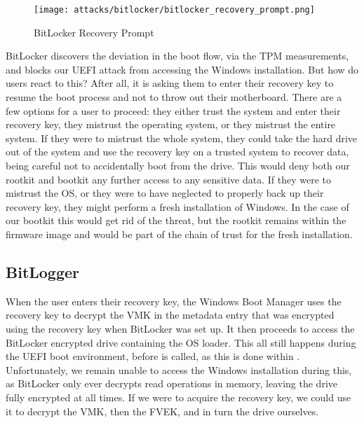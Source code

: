 \begin{figure}[htb]
    \centering
    \texttt{[image: attacks/bitlocker/bitlocker\_recovery\_prompt.png]}
    \caption{BitLocker Recovery Prompt}
    \label{fig:bitlocker-recovery-prompt}
\end{figure}

BitLocker discovers the deviation in the boot flow, via the \ac{TPM} measurements, and blocks our \ac{UEFI} attack from accessing the Windows installation.
But how do users react to this?
After all, it is asking them to enter their recovery key to resume the boot process and not to throw out their motherboard.
There are a few options for a user to proceed: they either trust the system and enter their recovery key, they mistrust the operating system, or they mistrust the entire system.
If they were to mistrust the whole system, they could take the hard drive out of the system and use the recovery key on a trusted system to recover data, being careful not to accidentally boot from the drive.
This would deny both our rootkit and bootkit any further access to any sensitive data.
If they were to mistrust the \ac{OS}, or they were to have neglected to properly back up their recovery key, they might perform a fresh installation of Windows.
In the case of our bootkit this would get rid of the threat, but the rootkit remains within the firmware image and would be part of the chain of trust for the fresh installation.

\vspace{-0.5em}
\subsection{BitLogger}
\vspace{-0.5em}

When the user enters their recovery key, the Windows Boot Manager uses the recovery key to decrypt the \ac{VMK} in the metadata entry that was encrypted using the recovery key when BitLocker was set up.
It then proceeds to access the BitLocker encrypted drive containing the  \ac{OS} loader.
This all still happens during the \ac{UEFI} boot environment, before  is called, as this is done within .
Unfortunately, we remain unable to access the Windows installation during this, as BitLocker only ever decrypts read operations in memory, leaving the drive fully encrypted at all times.
If we were to acquire the recovery key, we could use it to decrypt the \ac{VMK}, then the \ac{FVEK}, and in turn the drive ourselves.

